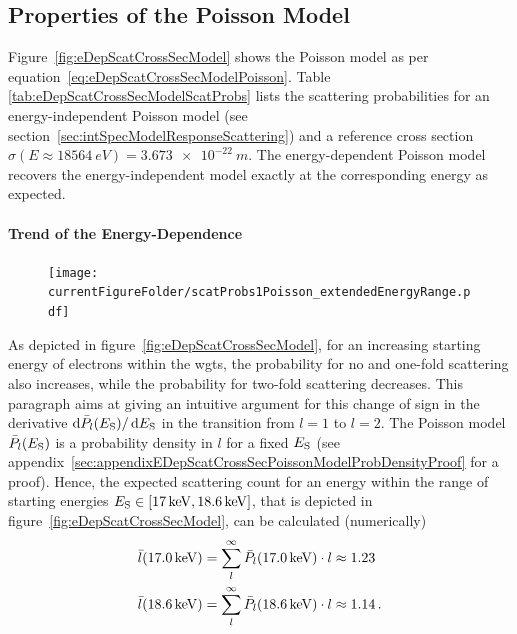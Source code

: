 \subsection{Properties of the Poisson Model}
\label{sec:eDepScatCrossSecModelPoissonProperties}
Figure~\ref{fig:eDepScatCrossSecModel} shows the Poisson model as per equation~\eqref{eq:eDepScatCrossSecModelPoisson}. Table \ref{tab:eDepScatCrossSecModelScatProbs} lists the scattering probabilities for an energy-independent Poisson model (see section~\ref{sec:intSpecModelResponseScattering}) and a reference cross section $\sigma(E\approx\SI{18564}{eV})=\SI{3.673e-22}{m}$. The energy-dependent Poisson model recovers the energy-independent model exactly at the corresponding energy as expected.

\paragraph{Trend of the Energy-Dependence}
\begin{figure}[th]
	\texttt{[image: \\currentFigureFolder/scatProbs1Poisson\_extendedEnergyRange.pdf]}
	\label{fig:eDepScatCrossSecModelPoissonP1ExtendedEnergyRange}
\end{figure}
As depicted in figure~\ref{fig:eDepScatCrossSecModel}, for an increasing starting energy of electrons within the \gls{wgts}, the probability for no and one-fold scattering also increases, while the probability for two-fold scattering decreases. This paragraph aims at giving an intuitive argument for this change of sign in the derivative $\mathop{}\!\mathrm{d} \bar{P}_l(E_\mathrm{S}) / \mathop{}\!\mathrm{d} E_\mathrm{S}$ in the transition from $l=1$ to $l=2$. The Poisson model $\bar{P}_l(E_\mathrm{S})$ is a probability density in $l$ for a fixed $E_\mathrm{S}$ (see appendix~\ref{sec:appendixEDepScatCrossSecPoissonModelProbDensityProof} for a proof). Hence, the expected scattering count for an energy within the range of starting energies $E_\mathrm{S} \in [\SI{17}{keV}, \SI{18.6}{keV}]$, that is depicted in figure~\ref{fig:eDepScatCrossSecModel}, can be calculated (numerically)
\begin{equation}
\label{eq:eDepScatCrossSecModelPoissonExpectedScatCount}
\begin{split}	
	\bar{l}(\SI{17.0}{keV}) &= 
	\sum_{l}^{\infty} \bar{P}_l(\SI{17.0}{keV}) \cdot l \approx 1.23 \\	
	\bar{l}(\SI{18.6}{keV}) &= 
	\sum_{l}^{\infty} \bar{P}_l(\SI{18.6}{keV}) \cdot l \approx 1.14
	\text{\,.}
\end{split}
\end{equation} 

